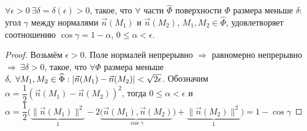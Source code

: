 \documentclass[a4paper,10pt]{article}
\begin{document}
	\begin{lem}
		$\forall \epsilon > 0 ~ \exists \delta = \delta(\epsilon) > 0$, такое, что $\forall$ части $\widehat{\Phi}$ поверхности $\Phi$ размера меньше $\delta :$ угол $\gamma$ между нормалями $\vec{n}(M_1)$ и $\vec{n}(M_2)$, $M_1, M_2 \in \widehat{\Phi}$, удовлетворяет соотношению $\cos \gamma = 1 - \alpha$, $0 \le \alpha < \epsilon$.
	\end{lem}
	
	\begin{proof}
		Возьмём $\epsilon > 0$. Поле нормалей непрерывно $\Rightarrow$ равномерно непрерывно $\Rightarrow ~ \exists \delta > 0$, такое, что $\forall \Phi$ размера меньше $\delta, ~ \forall M_1, M_2 \in \widehat{\Phi} : \\ |\vec{n}(M_1) - \vec{n}(M_2)| < \sqrt{2 \epsilon}$. 
		Обозначим $\alpha = \dfrac{1}{2}(\vec{n}(M_1)-\vec{n}(M_2))^2$, тогда $0 \le \alpha < \epsilon$ и \\ 
		$\alpha = \dfrac{1}{2} \bigg( \underbrace{\|\vec{n}(M_1)\|^2}_{1} - 2 \underbrace{(\vec{n}(M_1), \vec{n}(M_2)}_{\cos \gamma}) + \underbrace{\|\vec{n}(M_2)\|^2}_{1} \bigg) = 1 - \cos \gamma$
	\end{proof}
\end{document}

